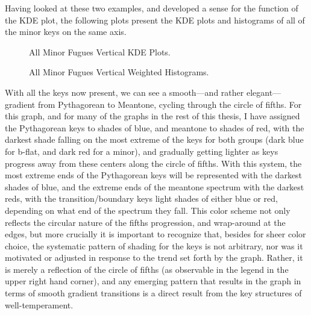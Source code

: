 Having looked at these two examples, and developed a sense for the
function of the KDE plot, the following plots present the KDE plots and
histograms of all of the minor keys on the same axis.




\begin{figure}[H]
    \begin{center}
    \caption{All Minor Fugues Vertical KDE Plots.}
    \end{center}
\end{figure}
    



\begin{figure}[H]
    \begin{center}
    \caption{All Minor Fugues Vertical Weighted Histograms.}
    \end{center}
\end{figure}
    
    With all the keys now present, we can see a smooth---and rather
elegant---gradient from Pythagorean to Meantone, cycling through the
circle of fifths. For this graph, and for many of the graphs in the rest
of this thesis, I have assigned the Pythagorean keys to shades of blue,
and meantone to shades of red, with the darkest shade falling on the
most extreme of the keys for both groups (dark blue for b-flat, and dark
red for a minor), and gradually getting lighter as keys progress away
from these centers along the circle of fifths. With this system, the
most extreme ends of the Pythagorean keys will be represented with the
darkest shades of blue, and the extreme ends of the meantone spectrum
with the darkest reds, with the transition/boundary keys light shades of
either blue or red, depending on what end of the spectrum they fall.
This color scheme not only reflects the circular nature of the fifths
progression, and wrap-around at the edges, but more crucially it is
important to recognize that, besides for sheer color choice, the
systematic pattern of shading for the keys is not arbitrary, nor was it
motivated or adjusted in response to the trend set forth by the graph.
Rather, it is merely a reflection of the circle of fifths (as observable
in the legend in the upper right hand corner), and any emerging pattern
that results in the graph in terms of smooth gradient transitions is a
direct result from the key structures of well-temperament.

